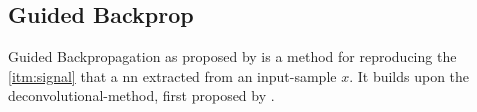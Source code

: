 \subsection{Guided Backprop}\label{subsect:guided-backprop}
Guided Backpropagation as proposed by  is a method for reproducing the \ref{itm:signal} that a \gls{nn} extracted from an input-sample \(x\).
It builds upon the deconvolutional-method, first proposed by .